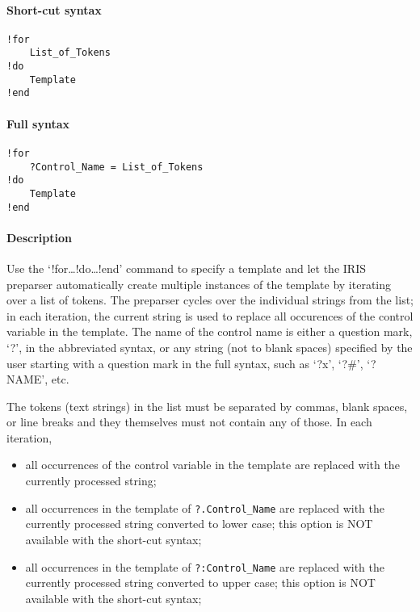 


	\paragraph{Short-cut syntax}\label{short-cut-syntax}

\begin{verbatim}
!for
    List_of_Tokens
!do
    Template
!end
\end{verbatim}

\paragraph{Full syntax}\label{full-syntax}

\begin{verbatim}
!for
    ?Control_Name = List_of_Tokens
!do
    Template
!end
\end{verbatim}

\paragraph{Description}\label{description}

Use the `!for\ldots{}!do\ldots{}!end' command to specify a template and
let the IRIS preparser automatically create multiple instances of the
template by iterating over a list of tokens. The preparser cycles over
the individual strings from the list; in each iteration, the current
string is used to replace all occurences of the control variable in the
template. The name of the control name is either a question mark, `?',
in the abbreviated syntax, or any string (not to blank spaces) specified
by the user starting with a question mark in the full syntax, such as
`?x', `?\#', `?NAME', etc.

The tokens (text strings) in the list must be separated by commas, blank
spaces, or line breaks and they themselves must not contain any of
those. In each iteration,

\begin{itemize}
\item
  all occurrences of the control variable in the template are replaced
  with the currently processed string;
\item
  all occurrences in the template of \texttt{?.Control\_Name} are
  replaced with the currently processed string converted to lower case;
  this option is NOT available with the short-cut syntax;
\item
  all occurrences in the template of \texttt{?:Control\_Name} are
  replaced with the currently processed string converted to upper case;
  this option is NOT available with the short-cut syntax;
\end{itemize}


